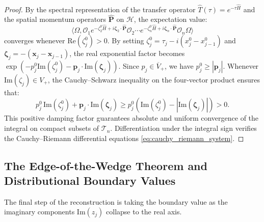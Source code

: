 \begin{proof}
By the spectral representation of the transfer operator $\hat{T}(\tau) = e^{-\tau \hat{H}}$ and the spatial momentum operators $\hat{\mathbf{P}}$ on $\mathcal{H}$, the expectation value:
\begin{equation}
\langle \Omega, \mathcal{O}_1 e^{-\zeta_2^0 \hat{H} + i \boldsymbol{\zeta}_2 \cdot \hat{\mathbf{P}}} \mathcal{O}_2 \cdots e^{-\zeta_n^0 \hat{H} + i \boldsymbol{\zeta}_n \cdot \hat{\mathbf{P}}} \mathcal{O}_n \Omega \rangle
\end{equation}
converges whenever $\mathrm{Re}(\zeta_j^0) > 0$. By setting $\zeta_j^0 = \tau_j - i (x_j^0 - x_{j-1}^0)$ and $\boldsymbol{\zeta}_j = -(\mathbf{x}_j - \mathbf{x}_{j-1})$, the real exponential factor becomes $\exp(-p_j^0 \mathrm{Im}(\zeta_j^0) - \mathbf{p}_j \cdot \mathrm{Im}(\boldsymbol{\zeta}_j))$. Since $p_j \in \overline{V}_+$, we have $p_j^0 \ge |\mathbf{p}_j|$. Whenever $\mathrm{Im}(\zeta_j) \in V_+$, the Cauchy--Schwarz inequality on the four-vector product ensures that:
\begin{equation}
p_j^0 \, \mathrm{Im}(\zeta_j^0) + \mathbf{p}_j \cdot \mathrm{Im}(\boldsymbol{\zeta}_j) \ge p_j^0 \left( \mathrm{Im}(\zeta_j^0) - |\mathrm{Im}(\boldsymbol{\zeta}_j)| \right) > 0.
\end{equation}
This positive damping factor guarantees absolute and uniform convergence of the integral on compact subsets of $\mathcal{T}_n$. Differentiation under the integral sign verifies the Cauchy--Riemann differential equations \eqref{eq:cauchy_riemann_system}.
\end{proof}

\subsection{The Edge-of-the-Wedge Theorem and Distributional Boundary Values}
\label{subsec:distributional_boundary_values}

The final step of the reconstruction is taking the boundary value as the imaginary components $\mathrm{Im}(z_j)$ collapse to the real axis.

